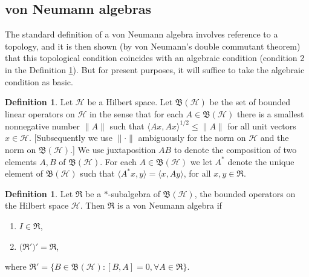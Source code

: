 \documentclass[11pt]{article}
\newcommand{\alg}[1]{\mathfrak{#1}}
\newcommand{\norm}[1]{\| #1\|}
\newcommand{\bh}{\mathfrak{B}(\mathcal{H})}
\theoremstyle{definition}
\theoremstyle{definition}
\newtheorem{defn}[thm]{Definition}
\theoremstyle{remark}
\def\2#1{{\mathcal #1}}
\begin{document}
\subsection{von Neumann algebras}

The standard definition of a von Neumann algebra involves reference to a topology,
and it is then shown (by von Neumann's double commutant theorem) that this
topological condition coincides with an algebraic condition (condition 2 in the
Definition \ref{vNA}).  But for present purposes, it will suffice to take the
algebraic condition as basic.

\begin{defn} Let $\2H$ be a Hilbert space.  Let $\bh$ be the set of
  bounded linear operators on $\2H$ in the sense that for each $A\in
  \bh$ there is a smallest nonnegative number $\norm{A}$ such that
  $\langle Ax,Ax\rangle ^{1/2}\leq \norm{A}$ for all unit vectors
  $x\in \2H$.  [Subsequently we use $\norm{\cdot }$ ambiguously for
  the norm on $\2H$ and the norm on $\bh$.]  We use juxtaposition $AB$
  to denote the composition of two elements $A,B$ of $\bh$.  For each
  $A\in \bh$ we let $A^*$ denote the unique element of $\bh$ such that
  $\langle A^*x,y\rangle =\langle x,Ay\rangle$, for all $x,y\in
  \alg{R}$.  \end{defn}

\begin{defn} Let $\alg{R}$ be a $*$-subalgebra of $\bh$, the bounded operators on the
  Hilbert space $\2H$.  Then $\alg{R}$ is a von Neumann algebra if
  \begin{enumerate}
\item $I\in \alg{R}$, 
\item $\alg(\alg{R}')'=\alg{R}$,
\end{enumerate}
where $\alg{R}'=\{ B\in \bh :[B,A]=0 ,\forall A\in \alg{R} \} $. \label{vNA}
\end{defn}
\end{document}
